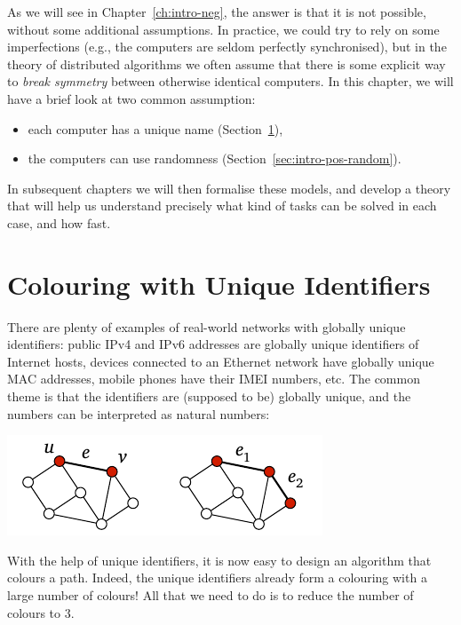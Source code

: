 As we will see in Chapter~\ref{ch:intro-neg}, the answer is that it is not possible, without some additional assumptions. In practice, we could try to rely on some imperfections (e.g., the computers are seldom perfectly synchronised), but in the theory of distributed algorithms we often assume that there is some explicit way to \emph{break symmetry} between otherwise identical computers. In this chapter, we will have a brief look at two common assumption:
\begin{itemize}[noitemsep]
    \item each computer has a unique name (Section~\ref{sec:intro-pos-id}),
    \item the computers can use randomness (Section~\ref{sec:intro-pos-random}).
\end{itemize}
In subsequent chapters we will then formalise these models, and develop a theory that will help us understand precisely what kind of tasks can be solved in each case, and how fast.


\section{Colouring with Unique Identifiers}\label{sec:intro-pos-id}

There are plenty of examples of real-world networks with globally unique identifiers: public IPv4 and IPv6 addresses are globally unique identifiers of Internet hosts, devices connected to an Ethernet network have globally unique MAC addresses, mobile phones have their IMEI numbers, etc. The common theme is that the identifiers are (supposed to be) globally unique, and the numbers can be interpreted as natural numbers:
\begin{center}
    \includegraphics[page=\PIntroId]{figs.pdf}
\end{center}
With the help of unique identifiers, it is now easy to design an algorithm that colours a path. Indeed, the unique identifiers already form a colouring with a large number of colours! All that we need to do is to reduce the number of colours to $3$.

